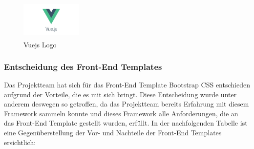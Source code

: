 \begin{figure}[h]
	\centering
	\includegraphics[height=2cm,width=3cm]{images/vuejs}
	\caption{Vuejs Logo}
	\label{fig:Vuejs Logo}
\end{figure}



\subsubsection{Entscheidung des Front-End Templates}
Das Projektteam hat sich für das Front-End Template Bootstrap CSS entschieden aufgrund der Vorteile, die es mit sich bringt. Diese Entscheidung wurde unter anderem deswegen so getroffen, da das Projektteam bereits Erfahrung mit diesem Framework sammeln konnte und dieses Framework alle Anforderungen, die an das Front-End Template gestellt wurden, erfüllt.
In der nachfolgenden Tabelle ist eine Gegenüberstellung der Vor- und Nachteile der Front-End Templates ersichtlich:

